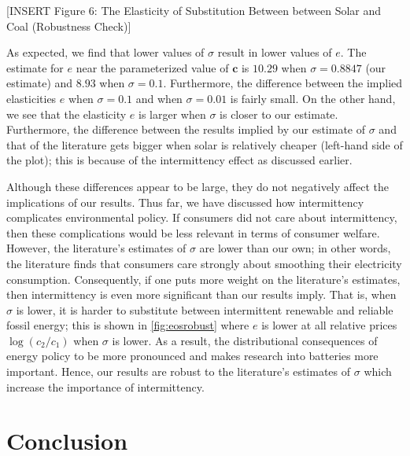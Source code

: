 \documentclass[11pt,a4paper,leqno]{extarticle}
\begin{document}
	
	\vspace{0.15in}
	\begin{center}
		[INSERT Figure 6: The Elasticity of Substitution Between between Solar and Coal \newline  (Robustness Check)]
	\end{center}
	\vspace{0.15in}
	
	As expected, we find that lower values of $\sigma$ result in lower values of $e$. The estimate for $e$ near the parameterized value of $\mathbf{c}$ is  $10.29$ when $\sigma = 0.8847$ (our estimate) and $8.93$ when $\sigma = 0.1$. Furthermore, the difference between the implied elasticities $e$ when $\sigma = 0.1$ and when $\sigma = 0.01$ is fairly small. On the other hand, we see that the elasticity $e$ is larger when $\sigma$ is closer to our estimate. Furthermore, the difference between the results implied by our estimate of $\sigma$ and that of the literature gets  bigger when solar is relatively cheaper (left-hand side of the plot); this is because of the intermittency effect as discussed earlier. 
	
	Although these differences appear to be large, they do not negatively affect the implications of our results. Thus far, we have discussed how intermittency complicates environmental policy. If consumers did not care about intermittency, then these complications would be less relevant in terms of consumer welfare. However,  the literature's estimates of $\sigma$ are lower than our own; in other words, the literature finds that consumers care strongly about smoothing their electricity consumption.  Consequently, if one puts more weight on the literature's estimates, then intermittency is even more significant than our results imply. That is, when $\sigma$ is lower, it is harder to substitute between intermittent renewable and reliable fossil energy; this is shown in \autoref{fig:eosrobust} where $e$ is lower at all relative prices $\log(c_2/c_1)$ when $\sigma$ is lower. As a result, the distributional consequences of energy policy to be more pronounced and makes research into batteries more important. Hence, our results are robust to the literature's estimates of $\sigma$ which increase the importance of intermittency. 
	
	
	
	\section{Conclusion}
	
\end{document}
